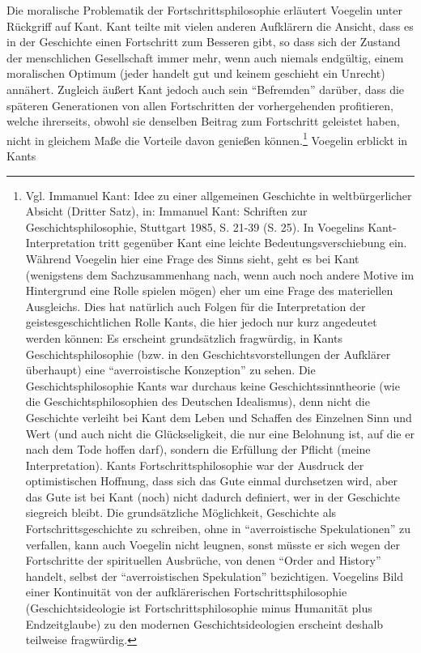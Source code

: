 Die moralische Problematik der Fortschrittsphilosophie erläutert Voegelin
unter Rückgriff auf Kant. Kant teilte mit vielen anderen Aufklärern die
Ansicht, dass es in der Geschichte einen Fortschritt zum Besseren gibt, so
dass sich der Zustand der menschlichen Gesellschaft immer mehr, wenn auch
niemals endgültig, einem moralischen Optimum (jeder handelt gut und keinem
geschieht ein Unrecht) annähert. Zugleich äußert Kant jedoch auch sein
"`Befremden"' darüber, dass die späteren Generationen von allen Fortschritten
der vorhergehenden profitieren, welche ihrerseits, obwohl sie denselben
Beitrag zum Fortschritt geleistet haben, nicht in gleichem Maße die Vorteile
davon genießen können.\footnote{Vgl. Immanuel Kant: Idee zu einer allgemeinen
  Geschichte in weltbürgerlicher Absicht (Dritter Satz), in: Immanuel Kant:
  Schriften zur Geschichtsphilosophie, Stuttgart 1985, S. 21-39 (S. 25). In
  Voegelins Kant-Interpretation tritt gegenüber Kant eine leichte
  Bedeutungsverschiebung ein. Während Voegelin hier eine Frage des Sinns
  sieht, geht es bei Kant (wenigstens dem Sachzusammenhang nach, wenn auch
  noch andere Motive im Hintergrund eine Rolle spielen mögen) eher um eine
  Frage des materiellen Ausgleichs.  Dies hat natürlich auch Folgen für die
  Interpretation der geistesgeschichtlichen Rolle Kants, die hier jedoch nur
  kurz angedeutet werden können: Es erscheint grundsätzlich fragwürdig, in
  Kants Geschichtsphilosophie (bzw. in den Geschichtsvorstellungen der
  Aufklärer überhaupt) eine "`averroistische Konzeption"' zu sehen. Die
  Geschichtsphilosophie Kants war durchaus keine Geschichtssinntheorie (wie
  die Geschichtsphilosophien des Deutschen Idealismus), denn nicht die
  Geschichte verleiht bei Kant dem Leben und Schaffen des Einzelnen Sinn und
  Wert (und auch nicht die Glückseligkeit, die nur eine Belohnung ist, auf die
  er nach dem Tode hoffen darf), sondern die Erfüllung der Pflicht (meine
  Interpretation). Kants Fortschrittsphilosophie war der Ausdruck der
  optimistischen Hoffnung, dass sich das Gute einmal durchsetzen wird, aber das
  Gute ist bei Kant (noch) nicht dadurch definiert, wer in der Geschichte
  siegreich bleibt.  Die grundsätzliche Möglichkeit, Geschichte als
  Fortschrittsgeschichte zu schreiben, ohne in "`averroistische
  Spekulationen"' zu verfallen, kann auch Voegelin nicht leugnen, sonst müsste
  er sich wegen der Fortschritte der spirituellen Ausbrüche, von denen "`Order
  and History"' handelt, selbst der "`averroistischen Spekulation"'
  bezichtigen. Voegelins Bild einer Kontinuität von der aufklärerischen
  Fortschrittsphilosophie (Geschichtsideologie ist Fortschrittsphilosophie
  minus Humanität plus Endzeitglaube) zu den modernen Geschichtsideologien
  erscheint deshalb teilweise fragwürdig.} Voegelin erblickt in Kants
